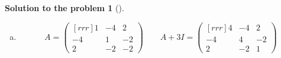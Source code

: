 \documentclass[12pt,a4]{article}
\newtheorem{solution}{Solution to the problem}
\newcommand{\norm}[1]{\left\lVert#1\right\rVert}
\newcommand{\bv}{{\mathbf v}}
\newcommand{\answer}[1]{\textbf{Answer:} #1}
\begin{document}
{\begin{solution}[]
\begin{enumerate}[(a)]
\[\begin{pmatrix}[rrr]
\end{pmatrix}
\quad
\hat \bv_3 = \frac{\bv_3}{\norm{\bv_3}} = 
\frac15
\begin{pmatrix}[rrr]
3 \\ 0 \\ 4
\end{pmatrix}
\]
$P = 
\begin{pmatrix}
\hat \bv_1 & \hat \bv_2 & \hat \bv_3
\end{pmatrix}$\\
\answer{$
P = 
\frac15
\begin{pmatrix}[rrr]
0 & 4 & 3 \\
5 & 0 & 0 \\
0 & -3 & 4 \\
\end{pmatrix}
\qquad
P^{-1}AP
=
\begin{pmatrix}[rrr]
3 & 0 & 0 \\
0 & 25 & 0 \\
0 & 0 & -50 \\
\end{pmatrix}$
\\[6pt]\hspace*{18mm}
or 
$P^{-1}AP = P^\top AP  = 
\frac15
\begin{pmatrix}[rrr]
0 & 5 & 0 \\
4 & 0 & -3 \\
3 & 0 & 4 \\
\end{pmatrix}
\begin{pmatrix}[rrr]
-2 & 0 & -36 \\
0 & 3 & 0 \\
-36 & 0 & -23
\end{pmatrix}
\frac15
\begin{pmatrix}[rrr]
0 & 4 & 3 \\
5 & 0 & 0 \\
0 & -3 & 4 \\
\end{pmatrix}
$}
\\
	\item
\[
A = 
\begin{pmatrix}[rrr]
1 & -4 & 2 \\
-4 & 1 & -2 \\
2 & -2 & -2
\end{pmatrix}
\qquad
A + 3I = 
\begin{pmatrix}[rrr]
4 & -4 & 2 \\
-4 & 4 & -2 \\
2 & -2 & 1
\end{pmatrix}
\]
\end{enumerate}
\end{solution}}
\end{document}
